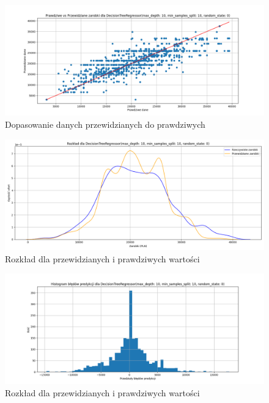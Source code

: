 \documentclass[a4paper]{article}
\begin{document}
\begin{figure}[H]
    \centering
    \includegraphics[width=\textwidth]{../analysis/plots/wyniki/0.6&0.4/DecisionTreeRegressor/scatter.png}
    \caption{Dopasowanie danych przewidzianych do prawdziwych}
\end{figure}

\begin{figure}[H]
    \centering
    \includegraphics[width=\textwidth]{../analysis/plots/wyniki/0.6&0.4/DecisionTreeRegressor/salary_dist.png}
    \caption{Rozkład dla przewidzianych i prawdziwych wartości}
\end{figure}

\begin{figure}[H]
    \centering
    \includegraphics[width=\textwidth]{../analysis/plots/wyniki/0.6&0.4/DecisionTreeRegressor/errors.png}
    \caption{Rozkład dla przewidzianych i prawdziwych wartości}
\end{figure}
\end{document}
